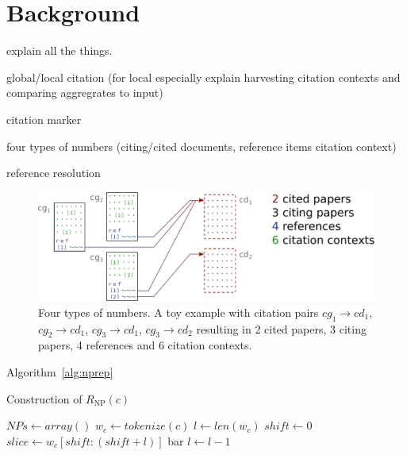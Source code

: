 \chapter{Background}\label{chap:background}
explain all the things.

global/local citation (for local especially explain harvesting citation contexts and comparing aggregrates to input)

citation marker

four types of numbers (citing/cited documents, reference items citation context)

reference resolution

\begin{figure}
  \centering
    \includegraphics[width=\textwidth]{figures/background/four_types_of_numbers_vertsqueeze.pdf}
  \caption[Four types of numbers.]{Four types of numbers. A toy example with citation pairs $cg_1\rightarrow cd_1$, $cg_2\rightarrow cd_1$, $cg_3\rightarrow cd_1$, $cg_3\rightarrow cd_2$ resulting in 2 cited papers, 3 citing papers, 4 references and 6 citation contexts.}
  \label{fig:fournumbers}
\end{figure}

Algorithm~\ref{alg:nprep}

\begin{algorithm}[ht]
\caption{Construction of $R_{\text{NP}}(c)$}
\label{alg:nprep}
\begin{algorithmic}
    \State $NPs \gets array()$     
    \State $w_c \gets tokenize(c)$     
    \State $l \gets len(w_c)$       
        \State $shift \gets 0$
            \State $slice \gets w_c[shift:(shift+l)]$       
                \State bar
            \EndIf
        \EndWhile
        \State $l \gets l-1$
    \EndWhile
\end{algorithmic}
\end{algorithm}
